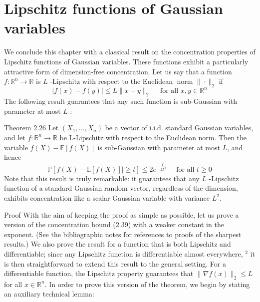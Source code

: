 \documentclass{article}
\begin{document}
\section{Lipschitz functions of Gaussian variables}
We conclude this chapter with a classical result on the concentration properties of Lipschitz functions of Gaussian variables. These functions exhibit a particularly attractive form of dimension-free concentration. Let us say that a function $f: \mathbb{R}^{n} \rightarrow \mathbb{R}$ is $L$ -Lipschitz with respect to the Euclidean $\operatorname{norm}\|\cdot\|_{2}$ if
$$
|f(x)-f(y)| \leq L\|x-y\|_{2} \quad \text { for all } x, y \in \mathbb{R}^{n}
$$
The following result guarantees that any such function is sub-Gaussian with parameter at most $L$ :

Theorem $2.26$ Let $\left(X_{1}, \ldots, X_{n}\right)$ be a vector of i.i.d. standard Gaussian variables, and
let $f: \mathbb{R}^{n} \rightarrow \mathbb{R}$ be L-Lipschitz with respect to the Euclidean norm. Then the variable $f(X)-\mathbb{E}[f(X)]$ is sub-Gaussian with parameter at most $L$, and hence
$$
\mathbb{P}[f(X)-\mathbb{E}[f(X)] \mid \geq t] \leq 2 e^{-\frac{t^{2}}{2 L^{2}}} \quad \text { for all } t \geq 0
$$
Note that this result is truly remarkable: it guarantees that any $L$ -Lipschitz function of a standard Gaussian random vector, regardless of the dimension, exhibits concentration like a scalar Gaussian variable with variance $L^{2}$.

Proof With the aim of keeping the proof as simple as possible, let us prove a version of the concentration bound (2.39) with a weaker constant in the exponent. (See the bibliographic notes for references to proofs of the sharpest results.) We also prove the result for a function that is both Lipschitz and differentiable; since any Lipschitz function is differentiable almost everywhere, ${ }^{2}$ it is then straightforward to extend this result to the general setting. For a differentiable function, the Lipschitz property guarantees that $\|\nabla f(x)\|_{2} \leq L$ for all $x \in \mathbb{R}^{n} .$ In order to prove this version of the theorem, we begin by stating an auxiliary technical lemma:


\end{document}
